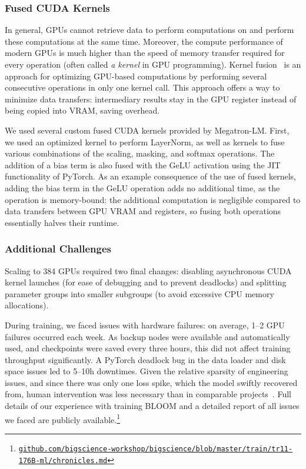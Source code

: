 \documentclass[twoside,11pt]{article}
\begin{document}
\subsubsection{Fused CUDA Kernels}

In general, GPUs cannot retrieve data to perform computations on and perform these computations at the same time. Moreover, the compute performance of modern GPUs is much higher than the speed of memory transfer required for every operation (often called \textit{a kernel} in GPU programming).
Kernel fusion~\citep{kernel_fusion} is an approach for optimizing GPU-based computations by performing several consecutive operations in only one kernel call. This approach offers a way to minimize data transfers: intermediary results stay in the GPU register instead of being copied into VRAM, saving overhead. 

We used several custom fused CUDA kernels provided by Megatron-LM. First, we used an optimized kernel to perform LayerNorm, as well as kernels to fuse various combinations of the scaling, masking, and softmax operations. The addition of a bias term is also fused with the GeLU activation using the JIT functionality of PyTorch. As an example consequence of the use of fused kernels, adding the bias term in the GeLU operation adds no additional time, as the operation is memory-bound: the additional computation is negligible compared to data transfers between GPU VRAM and registers, so fusing both operations essentially halves their runtime.

\subsubsection{Additional Challenges}

Scaling to 384 GPUs required two final changes: disabling asynchronous CUDA kernel launches (for ease of debugging and to prevent deadlocks) and splitting parameter groups into smaller subgroups (to avoid excessive CPU memory allocations). 

During training, we faced issues with hardware failures: on average, 1--2 GPU failures occurred each week. As backup nodes were available and automatically used, and checkpoints were saved every three hours, this did not affect training throughput significantly. A PyTorch deadlock bug in the data loader and disk space issues led to 5--10h downtimes. Given the relative sparsity of engineering issues, and since there was only one loss spike, which the model swiftly recovered from, human intervention was less necessary than in comparable projects~\citep{zhang2022opt}.
Full details of our experience with training BLOOM and a detailed report of all issues we faced are publicly available.\footnote{\href{https://github.com/bigscience-workshop/bigscience/blob/master/train/tr11-176B-ml/chronicles.md}{\texttt{github.com/bigscience-workshop/bigscience/blob/master/train/tr11-176B-ml/chronicles.md}}}
\end{document}
